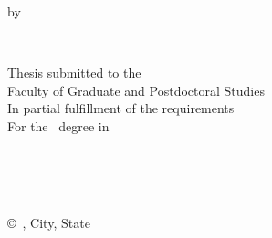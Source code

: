 
\pagestyle{empty}

\begin{titlepage}
		\begin{center}
		\vspace*{1.0cm}

		\Huge
		{\bf \thesistitlecoverpage }

		\vspace*{1.0cm}

		\normalsize
		by \\

		\vspace*{1.0cm}

		\Large
		\thesisauthor\\

		\vspace*{3.0cm}

		\normalsize
		Thesis submitted to the\\
		Faculty of Graduate and Postdoctoral Studies\\
		In partial fulfillment of the requirements\\
		For the \academicdegree~degree in\\
		\academicprogram\\

		\vspace*{2.0cm}

		\college\\
		\university\\

		\vspace*{4.0cm}

		\copyright~\thesisauthor, City, State\\
		\end{center}
\end{titlepage}

\pagestyle{plain}
\setcounter{page}{2}

\cleardoublepage



